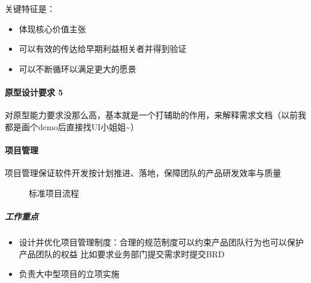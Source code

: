 \documentclass[letterpaper,10pt,english]{sphinxmanual}
\begin{document}
关键特征是：%
\begin{footnote}[85]\sphinxAtStartFootnote
{}
%
\end{footnote}
\begin{itemize}
\item {} 
体现核心价值主张

\item {} 
可以有效的传达给早期利益相关者并得到验证

\item {} 
可以不断循环以满足更大的愿景

\end{itemize}


\paragraph{原型设计要求 5\sphinxfootnotemark[86]}
\label{\detokenize{chapter_introduction/2B:id21}}%
\begin{footnotetext}[86]\sphinxAtStartFootnote
{}
%
\end{footnotetext}\ignorespaces 
对原型能力要求没那么高，基本就是一个打辅助的作用，来解释需求文档（以前我都是画个demo后直接找UI小姐姐\textasciitilde{}）


\paragraph{项目管理}
\label{\detokenize{chapter_introduction/2B:id22}}
项目管理保证软件开发按计划推进、落地，保障团队的产品研发效率与质量

\begin{figure}[H]
\centering
\capstart

\noindent{}
\caption{标准项目流程}\label{\detokenize{chapter_introduction/2B:id41}}\end{figure}


\subparagraph{工作重点}
\label{\detokenize{chapter_introduction/2B:id23}}\begin{itemize}
\item {} 
设计并优化项目管理制度：合理的规范制度可以约束产品团队行为也可以保护产品团队的权益
比如要求业务部门提交需求时提交BRD

\item {} 
负责大中型项目的立项实施

\end{itemize}
\end{document}
